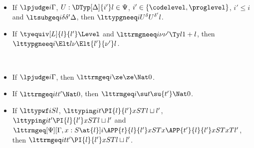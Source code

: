 \begin{law}  $ $
  \begin{itemize}
  \item If $\lpjudge i \Gamma$, $U : \DTyp[\Delta]{i'} l \in \Psi$, $i' \in \{\codelevel, \proglevel\}$,
    $i' \le i$ and
    $\ltsubgeq i \delta{\delta'} \Delta$, then
    $\lttypgneeq i{U^\delta}{U^{\delta'}}{l}$. 
  \item If $\tyequiv[L]{l}{l'}\Level$ and $\lttrmgneeq i \nu{\nu'}{\Ty l}{1 + l}$,
    then $\lttypgneeq i{\Elt l \nu}{\Elt{l'}{\nu'}}{l}$.
  \end{itemize}
\end{law}

\begin{law}[Congruence] $ $
  \begin{itemize}
  \item If $\lpjudge i \Gamma$, then $\lttrmgeq i \ze \ze \Nat 0$.
  \item If $\lttrmgeq i t{t'}\Nat 0$, then $\lttrmgeq i {\su t}{\su{t'}}\Nat 0$.
  \item If $\lttypwf i S l$, $\lttyping i t {\PI{l}{l'}x{S}{T}}{l \sqcup l'}$,
    $\lttyping i {t'}{\PI{l}{l'}x{S}{T}}{l \sqcup l'}$ and \newline
    $\lttrmgeq[\Psi][\Gamma, x : S \at{l}] i
    {\APP{t}{l}{l'}x{S}{T}{x}}{\APP{t'}{l}{l'}x{S}{T}{x}}{T}{l'}$, then \newline
    $\lttrmgeq i t{t'}{\PI{l}{l'}x{S}{T}}{l \sqcup l'}$.
  \end{itemize}
\end{law}

